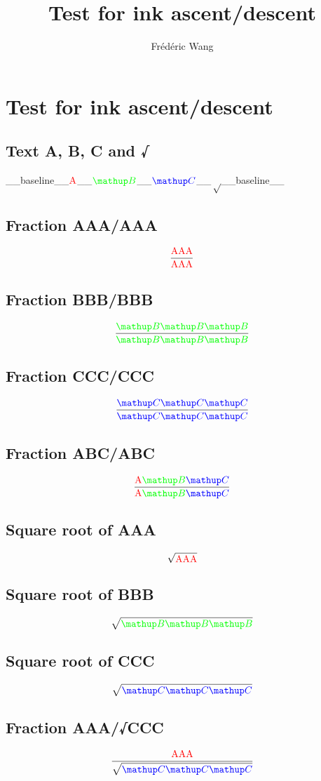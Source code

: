 \documentclass{article}
\title{Test for ink ascent/descent}
\author{Frédéric Wang}
\newcommand{\A}{\color{red}{\text A}}
\newcommand{\B}{\color{green}{\mathup B}}
\newcommand{\C}{\color{blue}{\mathup C}}
\begin{document}
\maketitle

\section{Test for ink ascent/descent}

\subsection{Text A, B, C and √}

\_\_baseline\_\_$\A$\_\_$\B$\_\_$\C$\_\_$√$\_\_baseline\_\_

\subsection{Fraction AAA/AAA}

$$\frac{\A\A\A}{\A\A\A}$$

\subsection{Fraction BBB/BBB}

$$\frac{\B\B\B}{\B\B\B}$$

\subsection{Fraction CCC/CCC}

$$\frac{\C\C\C}{\C\C\C}$$

\subsection{Fraction ABC/ABC}

$$\frac{\A\B\C}{\A\B\C}$$

\subsection{Square root of AAA}

$$\sqrt{\A\A\A}$$

\subsection{Square root of BBB}

$$\sqrt{\B\B\B}$$

\subsection{Square root of CCC}

$$\sqrt{\C\C\C}$$

\subsection{Fraction AAA/√CCC}

$$\frac{\A\A\A}{\displaystyle \sqrt{\C\C\C}}$$
\end{document}
